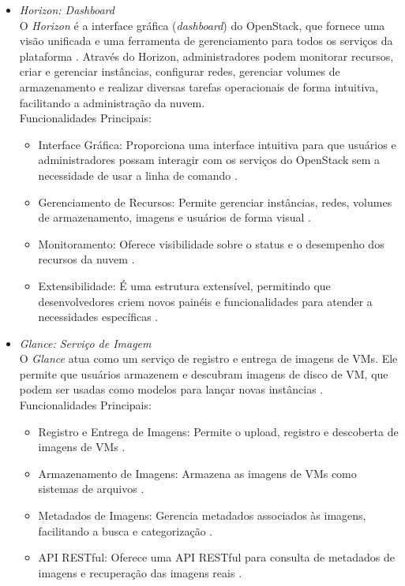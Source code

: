 \begin{itemize}
\begin{itemize}
    \item \emph{Horizon: Dashboard}\\
    O \textit{Horizon} é a interface gráfica (\textit{dashboard}) do OpenStack, que fornece uma visão unificada e uma ferramenta de gerenciamento para todos os serviços da plataforma \cite{openstackhorizon}. Através do Horizon, administradores podem monitorar recursos, criar e gerenciar instâncias, configurar redes, gerenciar volumes de armazenamento e realizar diversas tarefas operacionais de forma intuitiva, facilitando a administração da nuvem.\\
    Funcionalidades Principais:
    \begin{itemize}
        \item Interface Gráfica: Proporciona uma interface intuitiva para que usuários e administradores possam interagir com os serviços do OpenStack sem a necessidade de usar a linha de comando \cite{openstackhorizon}.
        \item Gerenciamento de Recursos: Permite gerenciar instâncias, redes, volumes de armazenamento, imagens e usuários de forma visual \cite{openstackhorizon}.
        \item Monitoramento: Oferece visibilidade sobre o status e o desempenho dos recursos da nuvem \cite{openstackhorizon}.
        \item Extensibilidade: É uma estrutura extensível, permitindo que desenvolvedores criem novos painéis e funcionalidades para atender a necessidades específicas \cite{openstackhorizon}.
    \end{itemize}

    \item \emph{Glance: Serviço de Imagem}\\
    O \textit{Glance} atua como um serviço de registro e entrega de imagens de VMs. Ele permite que usuários armazenem e descubram imagens de disco de VM, que podem ser usadas como modelos para lançar novas instâncias \cite{openstackglance}.\\
    Funcionalidades Principais:
    \begin{itemize}
        \item Registro e Entrega de Imagens: Permite o upload, registro e descoberta de imagens de VMs \cite{openstackglance}.
        \item Armazenamento de Imagens: Armazena as imagens de VMs como sistemas de arquivos \cite{openstackglance}.
        \item Metadados de Imagens: Gerencia metadados associados às imagens, facilitando a busca e categorização \cite{openstackglance}.
        \item API RESTful: Oferece uma API RESTful para consulta de metadados de imagens e recuperação das imagens reais \cite{openstackglance}.
    \end{itemize}


\end{itemize}
\end{itemize}

